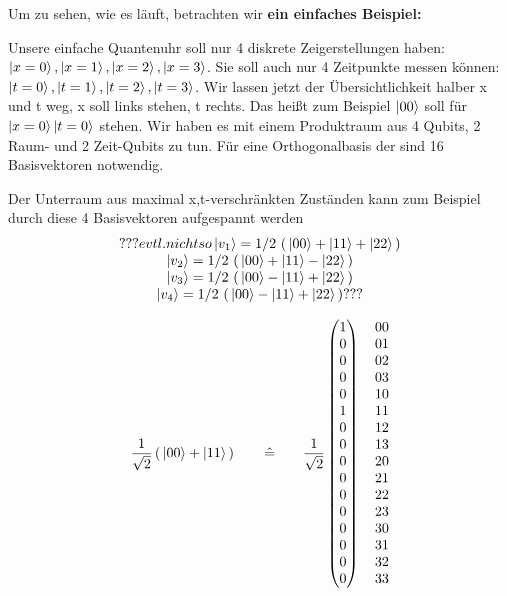 \documentclass[12pt]{article}
\begin{document}
Um zu sehen, wie es läuft, betrachten wir \textbf{ein einfaches Beispiel:}

Unsere einfache Quantenuhr soll nur 4 diskrete Zeigerstellungen haben: $\ket{x=0}, \ket{x=1}, \ket{x=2}, \ket{x=3}$. Sie soll auch nur 4 Zeitpunkte messen können: $\ket{t=0}, \ket{t=1}, \ket{t=2}, \ket{t=3}$. Wir lassen jetzt der Übersichtlichkeit halber x und t weg, x soll links stehen, t rechts. Das heißt zum Beispiel $\ket{00}$ soll für $\ket{x=0}\ket{t=0}$ stehen. Wir haben es mit einem Produktraum aus 4 Qubits, 2 Raum- und 2 Zeit-Qubits zu tun. Für eine Orthogonalbasis der sind 16 Basisvektoren notwendig.

Der Unterraum aus maximal x,t-verschränkten Zuständen kann zum Beispiel durch diese 4 Basisvektoren aufgespannt werden
\begin{equation}
\begin{matrix}
??? evtl. nicht so
\ket{v_1} = {1}/{2} \, \left(\, \ket{00} + \ket{11} + \ket{22} \,\right) \\
\ket{v_2} = {1}/{2} \, \left(\, \ket{00} + \ket{11} - \ket{22} \,\right) \\
\ket{v_3} = {1}/{2} \, \left(\, \ket{00} - \ket{11} + \ket{22} \,\right) \\
\ket{v_4} = {1}/{2} \, \left(\, \ket{00} - \ket{11} + \ket{22} \,\right) ???
\end{matrix}
\end{equation}

\begin{equation}
\frac{1}{\sqrt{2}} \left(\, \ket{00} + \ket{11} \,\right)
\quad\quad\hat{=}\quad\quad
\frac{1}{\sqrt{2}}
\begin{pmatrix}
1 \\ 0 \\ 0 \\ 0 \\ 0 \\ 1 \\ 0 \\ 0 \\ 0 \\ 0 \\ 0 \\ 0 \\ 0 \\ 0 \\ 0 \\ 0
\end{pmatrix}
\quad
\begin{matrix}
00 \\ 01 \\ 02 \\ 03 \\ 10 \\ 11 \\ 12 \\ 13 \\ 20 \\ 21 \\ 22 \\ 23 \\ 30 \\ 31 \\ 32 \\ 33 
\end{matrix}
\end{equation}
\end{document}
